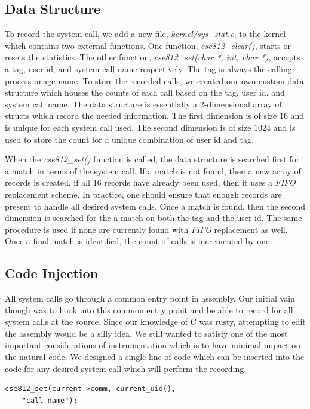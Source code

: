 \documentclass[conference]{IEEEtran}
\begin{document}
\subsection{Data Structure}
To record the system call, we add a new file, \textit{kernel/sys\_stat.c}, to the kernel which contains two external functions.
One function, \textit{cse812\_clear()}, starts or resets the statistics.
The other function, \textit{cse812\_set(char *, int, char *)}, accepts a tag, user id, and system call name respectively.
The tag is always the calling process image name.
To store the recorded calls, we created our own custom data structure which houses the counts of each call based on the tag, user id, and system call name.
The data structure is essentially a 2-dimensional array of structs which record the needed information.
The first dimension is of size $16$ and is unique for each system call used.
The second dimension is of size $1024$ and is used to store the count for a unique combination of user id and tag.

When the \textit{cse812\_set()} function is called, the data structure is searched first for a match in terms of the system call.
If a match is not found, then a new array of records is created, if all $16$ records have already been used, then it uses a \textit{FIFO} replacement scheme.
In practice, one should ensure that enough records are present to handle all desired system calls.
Once a match is found, then the second dimension is searched for the a match on both the tag and the user id.
The same procedure is used if none are currently found with \textit{FIFO} replacement as well.
Once a final match is identified, the count of calls is incremented by one.

\subsection{Code Injection}
All system calls go through a common entry point in assembly.
Our initial vain though was to hook into this common entry point and be able to record for all system calls at the source.
Since our knowledge of C was rusty, attempting to edit the assembly would be a silly idea.
We still wanted to satisfy one of the most important considerations of instrumentation which is to have minimal impact on the natural code.
We designed a single line of code which can be inserted into the code for any desired system call which will perform the recording.

\begin{verbatim}
cse812_set(current->comm, current_uid(),
    "call name");
\end{verbatim}
\end{document}
